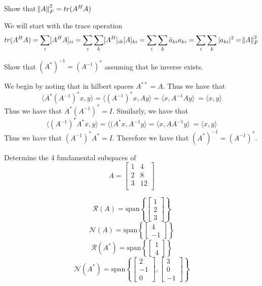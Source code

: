 \documentclass{homework}
\begin{document}
\begin{problem}[4-15]
  Show that $\norm{A}_F^2 = tr(A^HA)$ 
\end{problem}

\begin{solution}
  We will start with the trace operation
  \[ tr(A^HA) = \sum_{i} [A^HA]_{ii} = \sum_{i} \sum_{k} [A^H]_{ik}[A]_{ki} = \sum_{i} \sum_{k} \bar{a}_{ki} a_{ki} = 
  \sum_{i} \sum_{k} |a_{ki}|^2 = \norm{A}_F^2\]
\end{solution}

\begin{problem}[4-25]
  Show that $(A^*)^{-1} = (A^{-1})^*$ assuming that he inverse exists.
\end{problem}

\begin{solution}
  We begin by noting that in hilbert spaces $A^{**} = A$. Thus we have that
  \[ \langle A^*(A^{-1})^*x, y \rangle = \langle (A^{-1})^*x, Ay\rangle = \langle x, A^{-1}Ay\rangle\ = \langle x, y\rangle\]
  Thus we have that  $A^{*}(A^{-1})^* = I$. Similarly, we have that
  \[ \langle (A^{-1})^*A^*x, y \rangle = \langle (A^*x, A^{-1}y\rangle = \langle x, AA^{-1}y\rangle\ = \langle x, y\rangle\]
  Thus we have that  $(A^{-1})^*A^* = I$. Therefore we have that $(A^*)^{-1} = (A^{-1})^*$.
\end{solution}

\begin{problem}[4-29]
  Determine the 4 fundamental subspaces of 
  \[A =
    \begin{bmatrix}
      1 & 4 \\
      2 & 8 \\
      3 & 12 \\
    \end{bmatrix}
  \]
\end{problem}

\begin{solution}

  $$
  \mathcal{R}(A) = \text{span} \left\{
    \begin{bmatrix}
     1 \\
     2 \\
     3
    \end{bmatrix}
  \right\}
  $$
  $$
  \mathcal{N}(A) = \text{span} \left\{
    \begin{bmatrix}
    4 \\
    -1
    \end{bmatrix}
  \right\}
  $$
  $$
  \mathcal{R}(A^*) = \text{span} \left\{
    \begin{bmatrix}
     1 \\
     4
    \end{bmatrix}
  \right\}
  $$
  $$
  \mathcal{N}(A^*) = \text{span} \left\{
    \begin{bmatrix}
    2 \\
    -1 \\
    0
    \end{bmatrix},
    \begin{bmatrix}
    3 \\
    0 \\
    -1
    \end{bmatrix}
  \right\}
  $$
\end{solution}
\end{document}
